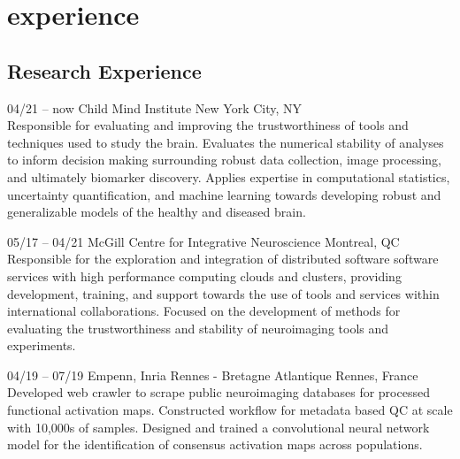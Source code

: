 \documentclass[]{friggeri-cv} %
\begin{document}

\section{experience}

\subsection{Research Experience}

\begin{entrylist}
\entry
{04/21 -- now}
{Child Mind Institute}
{New York City, NY}
{ \\
Responsible for evaluating and improving the trustworthiness of tools and techniques used to study the brain.
Evaluates the numerical stability of analyses to inform decision making surrounding robust data collection, image
processing, and ultimately biomarker discovery. Applies expertise in computational statistics, uncertainty
quantification, and machine learning towards developing robust and generalizable models of the
healthy and diseased brain.}

\entry
{05/17 -- 04/21}
{McGill Centre for Integrative Neuroscience}
{Montreal, QC}
{ \\
Responsible for the exploration and integration of distributed software software services with high
performance computing clouds and clusters, providing development, training, and support towards the
use of tools and services within international collaborations. Focused on the development of methods
for evaluating the trustworthiness and stability of neuroimaging tools and experiments.}

\entry
{04/19 -- 07/19}
{Empenn, Inria Rennes - Bretagne Atlantique}
{Rennes, France}
{\\
Developed web crawler to scrape public neuroimaging databases for processed functional activation maps. Constructed
workflow for metadata based QC at scale with 10,000s of samples. Designed and trained a convolutional neural network
model for the identification of consensus activation maps across populations.}

\end{entrylist}

%
\end{document}

